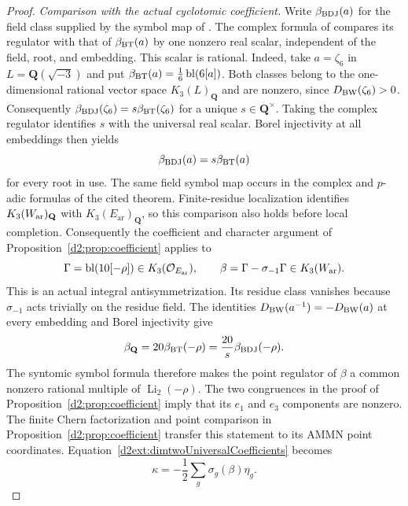 \begin{proof}
\emph{Comparison with the actual cyclotomic coefficient.}
Write $\beta_{\rm BDJ}(a)$ for the field class supplied by the
symbol map of \cite[Theorem~1.10(1)--(2) and Remark~1.7]{BesserDeJeu}.
The complex formula of \cite[Proposition~4.1 and Remark~5.2]{DeJeuWedge}
compares its regulator with that of $\beta_{\rm BT}(a)$ by one
nonzero real scalar, independent of the field, root, and embedding.
This scalar is rational. Indeed, take $a=\zeta_6$ in
$L=\mathbf Q(\sqrt{-3})$ and put
$\beta_{\rm BT}(a)=\frac16\operatorname{bl}(6[a])$.
Both classes belong to the one-dimensional rational vector space
$K_3(L)_{\mathbf Q}$ \cite[Proposition~12.2]{Borel}
and are nonzero, since $D_{\rm BW}(\zeta_6)>0$. Consequently
$\beta_{\rm BDJ}(\zeta_6)=s\beta_{\rm BT}(\zeta_6)$ for a
unique $s\in\mathbf Q^\times$. Taking the complex regulator
identifies $s$ with the universal real scalar. Borel injectivity
at all embeddings \cite[Section~6]{BunkeTamme} then yields
\[
 \beta_{\rm BDJ}(a)=s\beta_{\rm BT}(a)
\]
for every root in use. The same field symbol map occurs in the
complex and $p$-adic formulas of the cited theorem.
Finite-residue localization identifies
$K_3(W_{\rm ar})_{\mathbf Q}$ with $K_3(E_{\mathrm{ar}})_{\mathbf Q}$,
so this comparison also holds before local completion.
Consequently the coefficient and character argument of
Proposition~\ref{d2:prop:coefficient} applies to
\[
 \Gamma=\operatorname{bl}(10[-\rho])\in K_3(\mathcal O_{E_{\mathrm{ar}}}),
 \qquad \beta=\Gamma-\sigma_{-1}\Gamma\in K_3(W_{\rm ar}).
\]
This is an actual integral antisymmetrization. Its residue class
vanishes because $\sigma_{-1}$ acts trivially on the residue field.
The identities $D_{\rm BW}(a^{-1})=-D_{\rm BW}(a)$ at every
embedding and Borel injectivity \cite[Section~6]{BunkeTamme} give
\[
 \beta_{\mathbf Q}=20\beta_{\rm BT}(-\rho)
                  =\frac{20}{s}\beta_{\rm BDJ}(-\rho).
\]
The syntomic symbol formula therefore makes the point regulator
of $\beta$ a common nonzero rational multiple of
$\operatorname{Li}_2(-\rho)$. The two congruences in
the proof of Proposition~\ref{d2:prop:coefficient} imply that its $e_1$ and
$e_3$ components are nonzero. The finite Chern factorization and
point comparison in Proposition~\ref{d2:prop:coefficient}
transfer this statement to its AMMN point coordinates.
Equation~\eqref{d2ext:dimtwoUniversalCoefficients} becomes
\begin{equation}\label{d2ext:dimtwoExactHalf}
 \kappa=-\frac12\sum_g\sigma_g(\beta)\eta_g.
\end{equation}


\end{proof}
